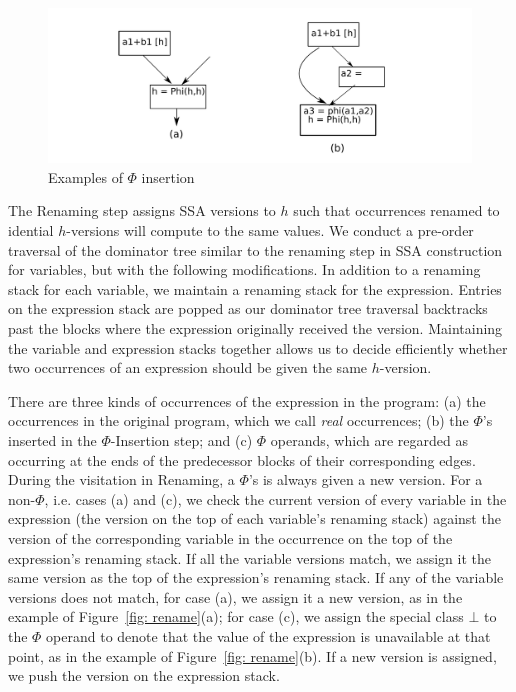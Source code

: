 \begin{figure}
\centering
\includegraphics[scale=0.45]{fig-phi-insertion.pdf}
\caption{Examples of $\Phi$ insertion}
\label{fig: phi-insertion}
\end{figure}

The Renaming step assigns SSA versions to $h$ such that occurrences
renamed to idential $h$-versions will compute to the same values.
We conduct a pre-order traversal of the dominator tree similar to the renaming
step in SSA construction for variables, but with the following modifications.
In addition to a renaming stack for each variable, we
maintain a renaming stack for the expression. Entries on the expression
stack are popped as our dominator tree traversal backtracks past the
blocks where the expression originally received the version.  
Maintaining the variable and expression stacks
together allows us to decide efficiently whether two occurrences of an
expression should be given the same $h$-version.

There are three kinds of occurrences of the expression in the program:
(a) the occurrences in the original program, which we call \emph{real}
occurrences; (b) the $\Phi$'s inserted in the $\Phi$-Insertion step; and
(c) $\Phi$ operands, which are regarded as occurring at the ends of the
predecessor blocks of their corresponding edges.  During the visitation in 
Renaming, a $\Phi$'s is always given a new version.  For a non-$\Phi$, i.e.
cases (a) and (c),
we check the current version of every variable in the expression (the
version on the top of each variable's renaming stack) against the version of
the corresponding variable in the occurrence on the top of the expression's
renaming stack.  If all the variable versions match, we assign it the same
version as the top of the expression's renaming stack.  If any of the 
variable versions does not match, for case (a), we assign it a new version, as
in the example of Figure~\ref{fig: rename}(a); for case (c),
we assign the special class $\bot$ to the $\Phi$ operand to denote that
the value of the expression is unavailable at that point, as in the example
of Figure~\ref{fig: rename}(b).  If a new version is assigned, we push
the version on the expression stack.

